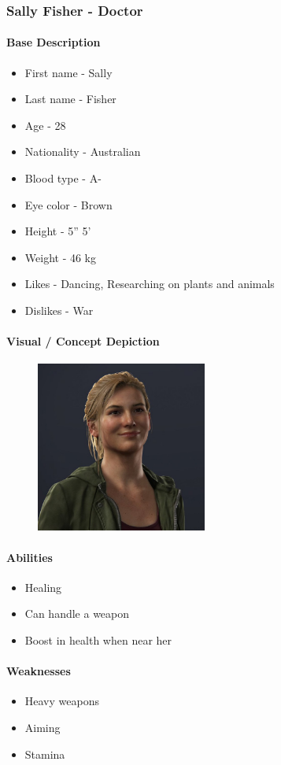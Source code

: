 \subsubsection{Sally Fisher - Doctor}
	\paragraph{Base Description}\mbox{}
		\begin{itemize}
			\item First name - Sally
			\item Last name - Fisher
			\item Age - 28
			\item Nationality - Australian
			\item Blood type - A-
			\item Eye color - Brown
			\item Height - 5” 5’
			\item Weight - 46 kg
			\item Likes - Dancing, Researching on plants and animals
			\item Dislikes - War
		\end{itemize}
	\paragraph{Visual / Concept Depiction}\mbox{}
		\begin{figure}[H]
			\centering
			\includegraphics[width=0.5\textwidth]{images/characters/sally}
		\end{figure}
	\paragraph{Abilities}\mbox{}
		\begin{itemize}
			\item Healing
			\item Can handle a weapon
			\item Boost in health when near her
		\end{itemize}
	\paragraph{Weaknesses}\mbox{}
		\begin{itemize}
			\item Heavy weapons
			\item Aiming
			\item Stamina
		\end{itemize}